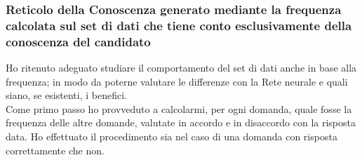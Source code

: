 \subsubsection{Reticolo della Conoscenza generato mediante la frequenza calcolata sul set di dati che tiene conto esclusivamente della conoscenza del candidato}
\label{Reticolo della Conoscenza generato mediante la frequenza calcolata sul set di dati che tiene conto eclusivamente della conoscenza del candidato}
Ho ritenuto adeguato studiare il comportamento del set di dati anche in base alla frequenza; in modo da poterne valutare le differenze con la Rete neurale e quali siano, se esistenti, i benefici.\\
Come primo passo ho provveduto a calcolarmi, per ogni domanda, quale fosse la frequenza delle altre domande, valutate in accordo e in disaccordo con la risposta data. Ho effettuato il procedimento sia nel caso di una domanda con risposta correttamente che non.

